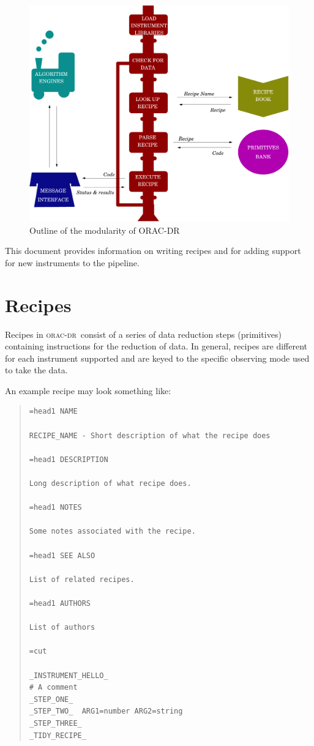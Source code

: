 \documentclass[twoside,11pt]{article}
\renewcommand{\_}{\texttt{\symbol{95}}}
\newcommand{\Oracdr}{\textsc{orac-dr}}
\newenvironment{myquote}{\begin{quote}\begin{small}}{\end{small}\end{quote}}
\begin{document}
\begin{figure}
\includegraphics[width=\textwidth]{sun233_train}
\caption{Outline of the modularity of ORAC-DR}
\label{fig:train}
\end{figure}

This document provides information on writing recipes and for adding
support for new instruments to the pipeline.


\section{Recipes}

Recipes in \Oracdr\ consist of a series of data reduction steps
(primitives) containing instructions for the reduction of
data. In general, recipes are different for each instrument supported
and are keyed to the specific observing mode used to take the data.

An example recipe may look something like:

\begin{myquote}
\begin{verbatim}
=head1 NAME

RECIPE_NAME - Short description of what the recipe does

=head1 DESCRIPTION

Long description of what recipe does.

=head1 NOTES

Some notes associated with the recipe.

=head1 SEE ALSO

List of related recipes.

=head1 AUTHORS

List of authors

=cut

_INSTRUMENT_HELLO_
# A comment
_STEP_ONE_
_STEP_TWO_  ARG1=number ARG2=string
_STEP_THREE_
_TIDY_RECIPE_
\end{verbatim}
\end{myquote}
\end{document}
